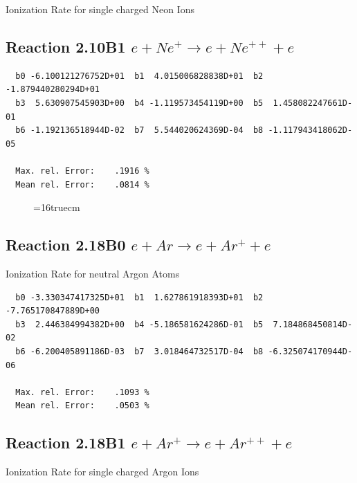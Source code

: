 \documentclass[12pt,dvips]{article}
\begin{document}
 Ionization Rate for single charged Neon Ions

\subsection{
Reaction 2.10B1  $ e + Ne^+ \rightarrow e + Ne^{++} + e $
}

\begin{small}\begin{verbatim}
  b0 -6.100121276752D+01  b1  4.015006828838D+01  b2 -1.879440280294D+01
  b3  5.630907545903D+00  b4 -1.119573454119D+00  b5  1.458082247661D-01
  b6 -1.192136518944D-02  b7  5.544020624369D-04  b8 -1.117943418062D-05

  Max. rel. Error:    .1916 %
  Mean rel. Error:    .0814 %

\end{verbatim}\end{small}


\begin{figure} \label{2.10B0}
\epsfxsize=16truecm
\end{figure}

\newpage

\subsection{
Reaction 2.18B0   $e + Ar  \rightarrow e + Ar^+  + e$
}

  Ionization Rate for neutral Argon Atoms

\begin{small}\begin{verbatim}
  b0 -3.330347417325D+01  b1  1.627861918393D+01  b2 -7.765170847889D+00
  b3  2.446384994382D+00  b4 -5.186581624286D-01  b5  7.184868450814D-02
  b6 -6.200405891186D-03  b7  3.018464732517D-04  b8 -6.325074170944D-06

  Max. rel. Error:    .1093 %
  Mean rel. Error:    .0503 %

\end{verbatim}\end{small}



\subsection{
Reaction 2.18B1   $e + Ar^+ \rightarrow e + Ar^{++} + e$
}

  Ionization Rate for single charged Argon Ions
\end{document}
